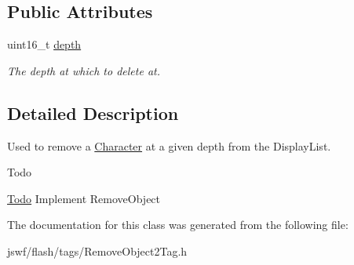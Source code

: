 \subsection*{Public Attributes}
\begin{DoxyCompactItemize}
\item 
\hypertarget{classjswf_1_1flash_1_1tags_1_1_remove_object2_tag_aca98cdc0c0a22ec84ca3bfdefa49df6b}{uint16\+\_\+t \hyperlink{classjswf_1_1flash_1_1tags_1_1_remove_object2_tag_aca98cdc0c0a22ec84ca3bfdefa49df6b}{depth}}\label{classjswf_1_1flash_1_1tags_1_1_remove_object2_tag_aca98cdc0c0a22ec84ca3bfdefa49df6b}

\begin{DoxyCompactList}\small\item\em The depth at which to delete at. \end{DoxyCompactList}\end{DoxyCompactItemize}


\subsection{Detailed Description}
Used to remove a {\ttfamily \hyperlink{classjswf_1_1flash_1_1_character}{Character}} at a given depth from the {\ttfamily Display\+List}. 

\begin{DoxyRefDesc}{Todo}
\item[\hyperlink{todo__todo000018}{Todo}]Implement {\ttfamily Remove\+Object} \end{DoxyRefDesc}


The documentation for this class was generated from the following file\+:\begin{DoxyCompactItemize}
\item 
jswf/flash/tags/Remove\+Object2\+Tag.\+h\end{DoxyCompactItemize}
